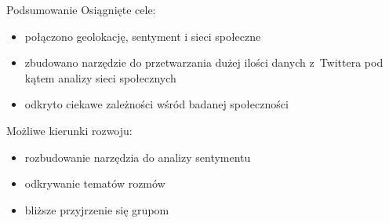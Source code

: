 \documentclass{beamer}
\begin{document}
\appendix
\begin{frame}{Podsumowanie}
Osiągnięte cele:
\begin{itemize}
\item połączono geolokację, sentyment i sieci społeczne
\item zbudowano narzędzie do przetwarzania dużej ilości danych z~Twittera pod
kątem analizy sieci społecznych
\item odkryto ciekawe zależności wśród badanej społeczności
\end{itemize}
\vspace{0.5cm}
Możliwe kierunki rozwoju:
\begin{itemize}
\item rozbudowanie narzędzia do analizy sentymentu
\item odkrywanie tematów rozmów
\item bliższe przyjrzenie się grupom
\end{itemize} 
 
\end{frame} 
 
\end{document}
